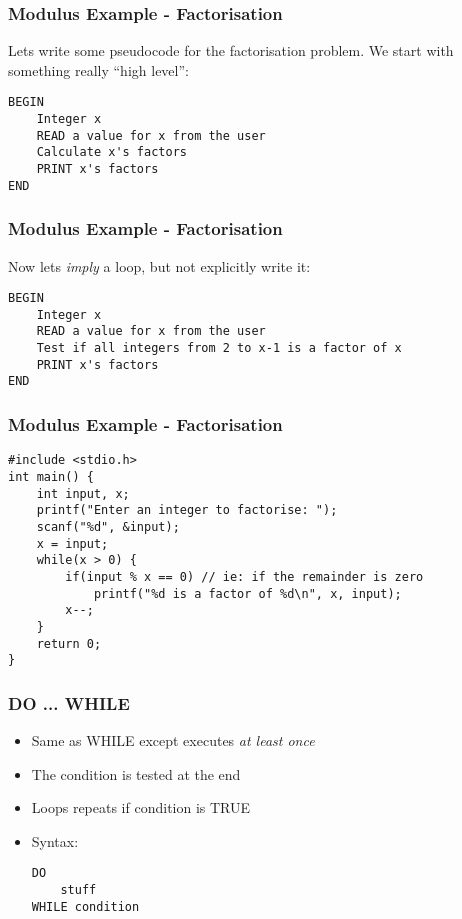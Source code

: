 \documentclass[14pt]{beamer}
\begin{document}
\begin{frame}[fragile]
\frametitle{Modulus Example - Factorisation}
Lets write some pseudocode for the factorisation problem. We start with something really ``high level'':
\begin{lstlisting}[style=pseudo]
BEGIN
	Integer x
	READ a value for x from the user
	Calculate x's factors
	PRINT x's factors
END
\end{lstlisting}
\end{frame}

\begin{frame}[fragile]
\frametitle{Modulus Example - Factorisation}
Now lets \textit{imply} a loop, but not explicitly write it:
\begin{lstlisting}[style=pseudo]
BEGIN
	Integer x
	READ a value for x from the user
	Test if all integers from 2 to x-1 is a factor of x
	PRINT x's factors
END
\end{lstlisting}
\end{frame}

\begin{frame}[fragile]
\frametitle{Modulus Example - Factorisation}
\begin{lstlisting}[style=CStyle,basicstyle=\ttfamily\footnotesize,caption=\texttt{factors.c}]
#include <stdio.h>
int main() {
	int input, x;
	printf("Enter an integer to factorise: ");
	scanf("%d", &input);
	x = input;
	while(x > 0) {
		if(input % x == 0) // ie: if the remainder is zero
			printf("%d is a factor of %d\n", x, input);
		x--;
	}
	return 0;
}
\end{lstlisting}
\end{frame}

\begin{frame}[fragile]
\frametitle{DO ... WHILE}
\begin{itemize}
\item Same as WHILE except executes \textit{at least once}
\item The condition is tested at the end
\item Loops repeats if condition is TRUE
\item Syntax:
\begin{lstlisting}[style=pseudo]
DO
	stuff
WHILE condition
\end{lstlisting}
\end{itemize}
\end{frame}
\end{document}
